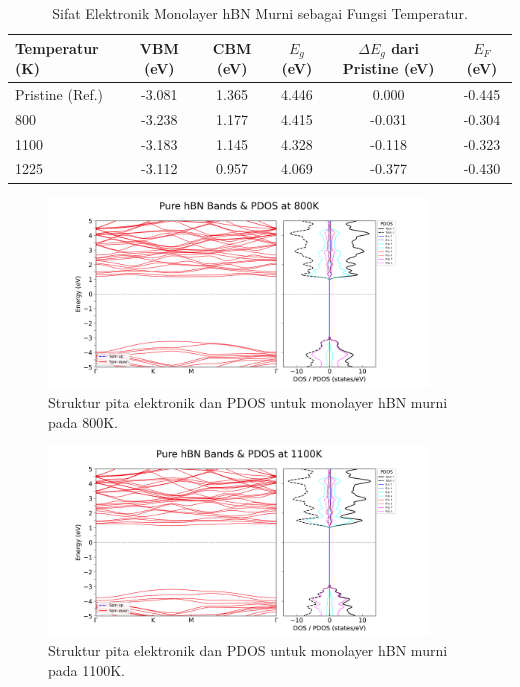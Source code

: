 \begin{table}[h!]
  \centering
  \caption{Sifat Elektronik Monolayer hBN Murni sebagai Fungsi Temperatur.}
  \label{tab:hbn_murni_suhu}
  \begin{tabular}{lccccc}
    \toprule
    Temperatur (K) & VBM (eV) & CBM (eV) & $E_g$ (eV) & $\Delta E_g$ dari Pristine (eV) & $E_F$ (eV) \\
    \midrule
    Pristine (Ref.) & -3.081 &  1.365 & 4.446 &  0.000 & -0.445 \\
    800             & -3.238 &  1.177 & 4.415 & -0.031 & -0.304 \\
    1100            & -3.183 &  1.145 & 4.328 & -0.118 & -0.323 \\
    1225            & -3.112 &  0.957 & 4.069 & -0.377 & -0.430 \\
    \bottomrule
  \end{tabular}
\end{table}

\begin{figure}[h!]
    \centering
    \includegraphics[width=0.9\textwidth]{gambar_hasil/simple_bands_pdos_pure_800K.png}
    \caption{Struktur pita elektronik dan PDOS untuk monolayer hBN murni pada 800K.}
    \label{fig:hbn_pure_800K}
\end{figure}

\begin{figure}[h!]
    \centering
    \includegraphics[width=0.9\textwidth]{gambar_hasil/simple_bands_pdos_pure_1100K.png}
    \caption{Struktur pita elektronik dan PDOS untuk monolayer hBN murni pada 1100K.}
    \label{fig:hbn_pure_1100K}
\end{figure}

